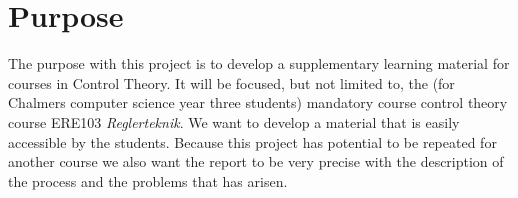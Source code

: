\section{Purpose}
The purpose with this project is to develop a supplementary learning material for courses in Control Theory. It will be focused, but not limited to, the (for Chalmers computer science year three students) mandatory course control theory course ERE103 \textit{Reglerteknik}. We want to develop a material that is easily accessible by the students. Because this project has potential to be repeated for another course we also want the report to be very precise with the description of the process and the problems that has arisen.

\iffalse
Syfte
Specificerar vad rapporten är tänkt att resultera i och vilken typ av resultat som kommer att uppnås. 
Lämpligt att ha ett generellt syfte, kanske några få specificerade delsyften. 
I problemanalysen bryts syftet ner i mer detaljerade delsyften.
\fi